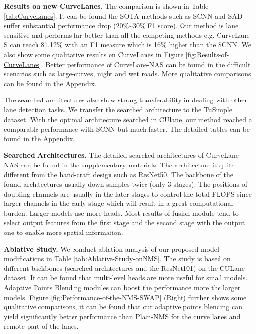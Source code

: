 \documentclass[runningheads]{llncs}
\begin{document}
\textbf{Results on new CurveLanes.} The comparison is shown in Table
\ref{tab:CurveLanes}. It can be found the SOTA methods such as SCNN
and SAD suffer substantial performance drop (20\%\textasciitilde 30\%
F1 score). Our method is lane sensitive and performs far better than
all the competing methods e.g. CurveLane-S can reach 81.12\% with
an F1 measure which is 16\% higher than the SCNN. We also show some
qualitative results on CurveLanes in Figure \ref{fig:Results-of-CurveLanes}.
Better performance of CurveLane-NAS can be found in the difficult
scenarios such as large-curves, night and wet roads. More qualitative
comparisons can be found in the Appendix.

The searched architectures also show strong transferability in dealing
with other lane detection tasks. We transfer the searched architecture
to the TuSimple dataset. With the optimal architecture searched in
CUlane, our method reached a comparable performance with SCNN but
much faster. The detailed tables can be found in the Appendix.

\textbf{Searched Architectures.} The detailed searched architectures
of CurveLane-NAS can be found in the supplementary materials. The
architecture is quite different from the hand-craft design such as
ResNet50. The backbone of the found architectures usually down-samples
twice (only 3 stages). The positions of doubling channels are usually
in the later stages to control the total FLOPS since larger channels
in the early stage which will result in a great computational burden.
Larger models use more heads. Most results of fusion module tend to
select output features from the first stage and the second stage with
the output one to enable more spatial information.

\textbf{Ablative Study.} We conduct ablation analysis of our proposed
model modifications in Table \ref{tab:Ablative-Study-onNMS}. The
study is based on different backbones (searched architectures and
the ResNet101) on the CULane dataset. It can be found that multi-level
heads are more useful for small models. Adaptive Points Blending modules
can boost the performance more the larger models. Figure \ref{fig:Performance-of-the-NMS-SWAP}
(Right) further shows some qualitative comparisons, it can be found
that our adaptive points blending can yield significantly better performance
than Plain-NMS for the curve lanes and remote part of the lanes.
\end{document}
